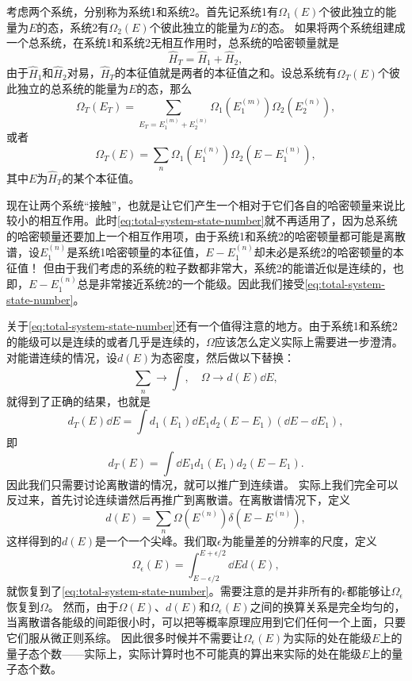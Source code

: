 \documentclass[hyperref, UTF8, a4paper]{ctexart}
\begin{document}
考虑两个系统，分别称为系统1和系统2。首先记系统1有$\Omega_1 (E)$个彼此独立的能量为$E$的态，系统2有$\Omega_2 (E)$个彼此独立的能量为$E$的态。
如果将两个系统组建成一个总系统，在系统1和系统2无相互作用时，总系统的哈密顿量就是
\[
    \hat{H}_T = \hat{H}_1 + \hat{H}_2,
\]
由于$\hat{H}_1$和$\hat{H}_2$对易，$\hat{H}_T$的本征值就是两者的本征值之和。设总系统有$\Omega_T(E)$个彼此独立的总系统的能量为$E$的态，那么
\[
    \Omega_T (E_T) = \sum_{E_T=E_1^{(m)}+E_2^{(n)}} \Omega_1 (E_1^{(m)}) \Omega_2 (E_2^{(n)}),
\]
或者
\begin{equation}
    \Omega_T (E) = \sum_{n} \Omega_1 (E_1^{(n)}) \Omega_2 (E - E_1^{(n)}),
    \label{eq:total-system-state-number}
\end{equation}
其中$E$为$\hat{H}_T$的某个本征值。

现在让两个系统“接触”，也就是让它们产生一个相对于它们各自的哈密顿量来说比较小的相互作用。此时\eqref{eq:total-system-state-number}就不再适用了，因为总系统的哈密顿量还要加上一个相互作用项，由于系统1和系统2的哈密顿量都可能是离散谱，设$E_1^{(n)}$是系统1哈密顿量的本征值，$E-E_1^{(n)}$却未必是系统2的哈密顿量的本征值！
但由于我们考虑的系统的粒子数都非常大，系统2的能谱近似是连续的，也即，$E-E_1^{(n)}$总是非常接近系统2的一个能级。因此我们接受\eqref{eq:total-system-state-number}。

关于\eqref{eq:total-system-state-number}还有一个值得注意的地方。由于系统1和系统2的能级可以是连续的或者几乎是连续的，$\Omega$应该怎么定义实际上需要进一步澄清。
对能谱连续的情况，设$d(E)$为态密度，然后做以下替换：
\[
    \sum_n \longrightarrow \int , \quad \Omega \longrightarrow d(E) \dd{E},
\]
就得到了正确的结果，也就是
\[
    d_T(E) \dd{E} = \int d_1 (E_1) \dd{E_1} d_2 (E - E_1) (\dd{E} - \dd{E_1}),
\]
即
\begin{equation}
    d_T(E) = \int \dd{E_1} d_1 (E_1) d_2 (E - E_1).
    \label{eq:canonical-state-continue}
\end{equation}
因此我们只需要讨论离散谱的情况，就可以推广到连续谱。
实际上我们完全可以反过来，首先讨论连续谱然后再推广到离散谱。在离散谱情况下，定义
\[
    d(E) = \sum_n \Omega(E^{(n)}) \delta(E - E^{(n)}),
\]
这样得到的$d(E)$是一个一个尖峰。我们取$\epsilon$为能量差的分辨率的尺度，定义
\[
    \Omega_\epsilon (E) = \int_{E-\epsilon/2}^{E+\epsilon/2} \dd{E} d(E),
\]
就恢复到了\eqref{eq:total-system-state-number}。需要注意的是并非所有的$\epsilon$都能够让$\Omega_\epsilon$恢复到$\Omega$。
然而，由于$\Omega(E)$、$d(E)$和$\Omega_\epsilon(E)$之间的换算关系是完全均匀的，当离散谱各能级的间距很小时，可以把等概率原理应用到它们任何一个上面，只要它们服从微正则系综。
因此很多时候并不需要让$\Omega_\epsilon(E)$为实际的处在能级$E$上的量子态个数——实际上，实际计算时也不可能真的算出来实际的处在能级$E$上的量子态个数。
\end{document}

